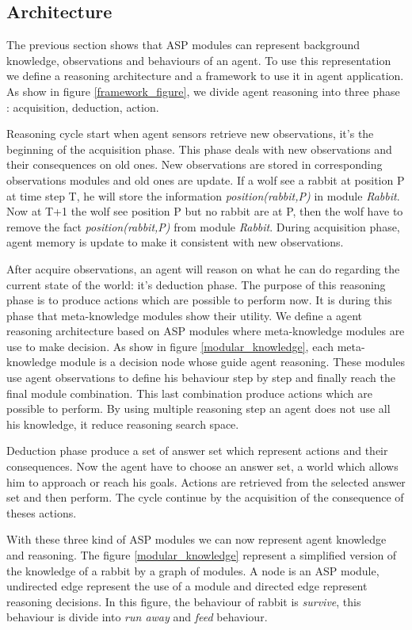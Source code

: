\documentclass{aamas2012}
\begin{document}
\subsection{Architecture}

	The previous section shows that ASP modules can represent background knowledge, observations and behaviours of an agent.
	To use this representation we define a reasoning architecture and a framework to use it in agent application.
	As show in figure \ref{framework_figure}, we divide agent reasoning into three phase : acquisition, deduction, action.
	
	Reasoning cycle start when agent sensors retrieve new observations, it's the beginning of the acquisition phase.
	This phase deals with new observations and their consequences on old ones.
	New observations are stored in corresponding observations modules and old ones are update.
	If a wolf see a rabbit at position P at time step T, he will store the information \textit{position(rabbit,P)} in module \textit{Rabbit}.
	Now at T+1 the wolf see position P but no rabbit are at P, then the wolf have to remove the fact \textit{position(rabbit,P)} from module \textit{Rabbit}.
	During acquisition phase, agent memory is update to make it consistent with new observations.
	
	After acquire observations, an agent will reason on what he can do regarding the current state of the world: it's deduction phase.
	The purpose of this reasoning phase is to produce actions which are possible to perform now.
	It is during this phase that meta-knowledge modules show their utility.
	We define a agent reasoning architecture based on ASP modules where meta-knowledge modules are use to make decision.
	As show in figure \ref{modular_knowledge}, each meta-knowledge module is a decision node whose guide agent reasoning.
	These modules use agent observations to define his behaviour step by step and finally reach the final module combination.
	This last combination produce actions which are possible to perform.
	By using multiple reasoning step an agent does not use all his knowledge, it reduce reasoning search space.
	
	Deduction phase produce a set of answer set which represent actions and their consequences.
	Now the agent have to choose an answer set, a world which allows him to approach or reach his goals.
	Actions are retrieved from the selected answer set and then perform.
	The cycle continue by the acquisition of the consequence of theses actions.

	With these three kind of ASP modules we can now represent agent knowledge and reasoning.
	The figure \ref{modular_knowledge} represent a simplified version of the knowledge of a rabbit by a graph of modules.
	A node is an ASP module, undirected edge represent the use of a module and directed edge represent reasoning decisions.
	In this figure, the behaviour of rabbit is \textit{survive}, this behaviour is divide into \textit{run away} and \textit{feed} behaviour.
\end{document}
